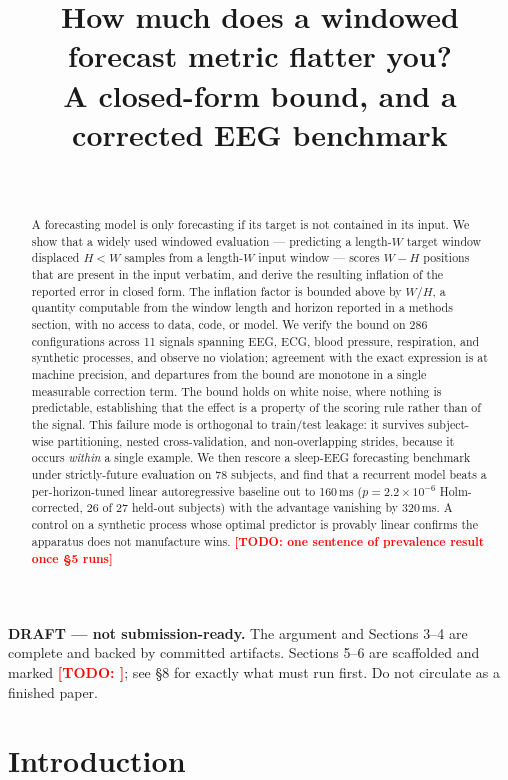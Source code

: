 \documentclass{article}
\title{How much does a windowed forecast metric flatter you?\\
A closed-form bound, and a corrected EEG benchmark}
\author{%
  \TODO{author block --- anonymised for submission} \\
}
\date{}
\newcommand{\TODO}[1]{\textcolor{red}{\textbf{[TODO: #1]}}}
\begin{document}
\maketitle

\begin{center}\small\colorbox{yellow!25}{%
\parbox{0.92\textwidth}{\textbf{DRAFT --- not submission-ready.} The argument and
Sections 3--4 are complete and backed by committed artifacts. Sections 5--6 are
scaffolded and marked \TODO{}; see \S8 for exactly what must run first. Do not
circulate as a finished paper.}}\end{center}

\begin{abstract}
A forecasting model is only forecasting if its target is not contained in its
input. We show that a widely used windowed evaluation --- predicting a length-$W$
target window displaced $H<W$ samples from a length-$W$ input window --- scores
$W-H$ positions that are present in the input verbatim, and derive the resulting
inflation of the reported error in closed form. The inflation factor is bounded
above by $W/H$, a quantity computable from the window length and horizon reported
in a methods section, with no access to data, code, or model. We verify the bound
on 286 configurations across 11 signals spanning EEG, ECG, blood pressure,
respiration, and synthetic processes, and observe no violation; agreement with the
exact expression is at machine precision, and departures from the bound are
monotone in a single measurable correction term. The bound holds on white noise,
where nothing is predictable, establishing that the effect is a property of the
scoring rule rather than of the signal. This failure mode is orthogonal to
train/test leakage: it survives subject-wise partitioning, nested
cross-validation, and non-overlapping strides, because it occurs \emph{within} a
single example. We then rescore a sleep-EEG forecasting benchmark under
strictly-future evaluation on 78 subjects, and find that a recurrent model beats a
per-horizon-tuned linear autoregressive baseline out to 160\,ms
($p=2.2\times10^{-6}$ Holm-corrected, 26 of 27 held-out subjects) with the
advantage vanishing by 320\,ms. A control on a synthetic process whose optimal
predictor is provably linear confirms the apparatus does not manufacture wins.
\TODO{one sentence of prevalence result once \S5 runs}
\end{abstract}

\section{Introduction}
\end{document}
